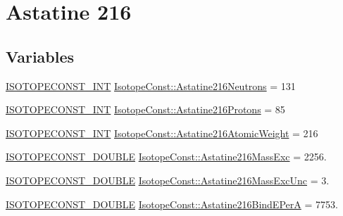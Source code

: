 \hypertarget{group___isotope_const-_astatine-_at216}{}\section{Astatine 216}
\label{group___isotope_const-_astatine-_at216}
\subsection*{Variables}
\begin{DoxyCompactItemize}
\item 
\mbox{\hyperlink{group___isotope_const-_macros_ga5f18360b3e99483a35c32d789e62621c}{I\+S\+O\+T\+O\+P\+E\+C\+O\+N\+S\+T\+\_\+\+I\+NT}} \mbox{\hyperlink{group___isotope_const-_astatine-_at216_gaaac3f224a2f17eccb2ad097a7cb9ec36}{Isotope\+Const\+::\+Astatine216\+Neutrons}} = 131
\item 
\mbox{\hyperlink{group___isotope_const-_macros_ga5f18360b3e99483a35c32d789e62621c}{I\+S\+O\+T\+O\+P\+E\+C\+O\+N\+S\+T\+\_\+\+I\+NT}} \mbox{\hyperlink{group___isotope_const-_astatine-_at216_ga2532771611c50f3e9d230fc4a3d2513c}{Isotope\+Const\+::\+Astatine216\+Protons}} = 85
\item 
\mbox{\hyperlink{group___isotope_const-_macros_ga5f18360b3e99483a35c32d789e62621c}{I\+S\+O\+T\+O\+P\+E\+C\+O\+N\+S\+T\+\_\+\+I\+NT}} \mbox{\hyperlink{group___isotope_const-_astatine-_at216_ga820dce2d86e33c752cd8f70103d332f5}{Isotope\+Const\+::\+Astatine216\+Atomic\+Weight}} = 216
\item 
\mbox{\hyperlink{group___isotope_const-_macros_ga8f45a7272ce02c0b4c65c44636ed719a}{I\+S\+O\+T\+O\+P\+E\+C\+O\+N\+S\+T\+\_\+\+D\+O\+U\+B\+LE}} \mbox{\hyperlink{group___isotope_const-_astatine-_at216_ga6169ce03e203a38dea4c0fbcdb423ca9}{Isotope\+Const\+::\+Astatine216\+Mass\+Exc}} = 2256.
\item 
\mbox{\hyperlink{group___isotope_const-_macros_ga8f45a7272ce02c0b4c65c44636ed719a}{I\+S\+O\+T\+O\+P\+E\+C\+O\+N\+S\+T\+\_\+\+D\+O\+U\+B\+LE}} \mbox{\hyperlink{group___isotope_const-_astatine-_at216_ga004dc53c3a03933fbcb9d508d16d9486}{Isotope\+Const\+::\+Astatine216\+Mass\+Exc\+Unc}} = 3.
\item 
\mbox{\hyperlink{group___isotope_const-_macros_ga8f45a7272ce02c0b4c65c44636ed719a}{I\+S\+O\+T\+O\+P\+E\+C\+O\+N\+S\+T\+\_\+\+D\+O\+U\+B\+LE}} \mbox{\hyperlink{group___isotope_const-_astatine-_at216_gac1b52126792c4284d0cb33eb92225cd7}{Isotope\+Const\+::\+Astatine216\+Bind\+E\+PerA}} = 7753.
\item 

\end{DoxyCompactItemize}
